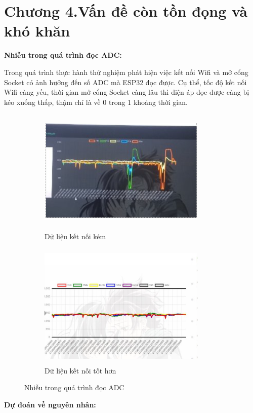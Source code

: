 \documentclass{article}
\begin{document}
\section*{Chương 4.Vấn đề còn tồn đọng và khó khăn}
\setcounter{section}{4}
\setcounter{subsection}{0}
\textbf{Nhiễu trong quá trình đọc ADC:}

Trong quá trình thực hành thử nghiệm phát hiện việc kết nối Wifi và mở cổng Socket có ảnh hưởng đến số ADC mà ESP32 đọc được. Cụ thể, tốc độ kết nối Wifi càng yếu, thời gian mở cổng Socket càng lâu thì điện áp đọc được càng bị kéo xuống thấp, thậm chí là về 0 trong 1 khoảng thời gian.

\begin{figure}[H]
    \centering
    \begin{subfigure}[b]{0.45\textwidth}
        \centering
        \includegraphics[width=8cm,height=6cm]{image/anh19.png}
        \caption{Dữ liệu kết nối kém} \label{EV1}
    \end{subfigure}
    \hfill
    \begin{subfigure}[b]{0.45\textwidth}
        \centering
        \includegraphics[width=8cm,height=6cm]{image/anh20.png}
        \caption{Dữ liệu kết nối tốt hơn} \label{EV2}
    \end{subfigure}
    \caption{Nhiễu trong quá trình đọc ADC}
    \label{fig:two_graphs}
\end{figure}
\textbf{Dự đoán về nguyên nhân:\\}
\end{document}
